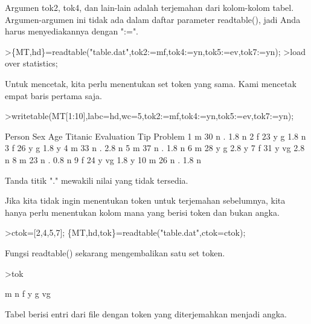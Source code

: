 \documentclass[12pt,arial,letterpaper]{book}
\begin{document}
\begin{eulernootebook}
\begin{eulercomment}
\begin{eulercomment}
\begin{eulernootebook}
\begin{eulercomment}
\begin{eulercomment}
\begin{eulercomment}
\begin{eulercomment}
\begin{eulercomment}
\begin{eulercomment}
\begin{eulercomment}
\begin{eulercomment}
Argumen tok2, tok4, dan lain-lain adalah terjemahan dari kolom-kolom
tabel. Argumen-argumen ini tidak ada dalam daftar parameter
readtable(), jadi Anda harus menyediakannya dengan ":=".
\end{eulercomment}
\begin{eulerprompt}
>\{MT,hd\}=readtable("table.dat",tok2:=mf,tok4:=yn,tok5:=ev,tok7:=yn);
>load over statistics;
\end{eulerprompt}
\begin{eulercomment}
Untuk mencetak, kita perlu menentukan set token yang sama. Kami
mencetak empat baris pertama saja.
\end{eulercomment}
\begin{eulerprompt}
>writetable(MT[1:10],labc=hd,wc=5,tok2:=mf,tok4:=yn,tok5:=ev,tok7:=yn);
\end{eulerprompt}
\begin{euleroutput}
   Person  Sex  Age Titanic Evaluation  Tip Problem
        1    m   30       n          .  1.8       n
        2    f   23       y          g  1.8       n
        3    f   26       y          g  1.8       y
        4    m   33       n          .  2.8       n
        5    m   37       n          .  1.8       n
        6    m   28       y          g  2.8       y
        7    f   31       y         vg  2.8       n
        8    m   23       n          .  0.8       n
        9    f   24       y         vg  1.8       y
       10    m   26       n          .  1.8       n
\end{euleroutput}
\begin{eulercomment}
Tanda titik "." mewakili nilai yang tidak tersedia.

Jika kita tidak ingin menentukan token untuk terjemahan sebelumnya,
kita hanya perlu menentukan kolom mana yang berisi token dan bukan
angka.
\end{eulercomment}
\begin{eulerprompt}
>ctok=[2,4,5,7]; \{MT,hd,tok\}=readtable("table.dat",ctok=ctok);
\end{eulerprompt}
\begin{eulercomment}
Fungsi readtable() sekarang mengembalikan satu set token.
\end{eulercomment}
\begin{eulerprompt}
>tok
\end{eulerprompt}
\begin{euleroutput}
  m
  n
  f
  y
  g
  vg
\end{euleroutput}
\begin{eulercomment}
Tabel berisi entri dari file dengan token yang diterjemahkan menjadi
angka.


\end{eulercomment}
\end{eulercomment}
\end{eulercomment}
\end{eulercomment}
\end{eulercomment}
\end{eulercomment}
\end{eulercomment}
\end{eulercomment}
\end{eulernootebook}
\end{eulercomment}
\end{eulercomment}
\end{eulernootebook}
\end{document}
